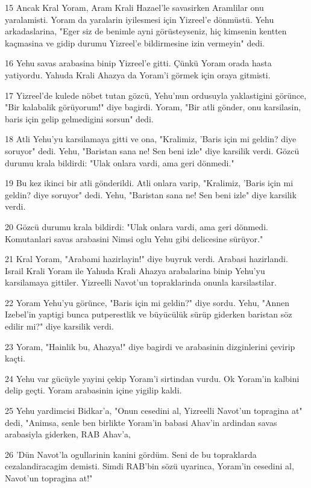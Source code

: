 \par 15 Ancak Kral Yoram, Aram Krali Hazael'le savasirken Aramlilar onu yaralamisti. Yoram da yaralarin iyilesmesi için Yizreel'e dönmüstü. Yehu arkadaslarina, "Eger siz de benimle ayni görüsteyseniz, hiç kimsenin kentten kaçmasina ve gidip durumu Yizreel'e bildirmesine izin vermeyin" dedi.
\par 16 Yehu savas arabasina binip Yizreel'e gitti. Çünkü Yoram orada hasta yatiyordu. Yahuda Krali Ahazya da Yoram'i görmek için oraya gitmisti.
\par 17 Yizreel'de kulede nöbet tutan gözcü, Yehu'nun ordusuyla yaklastigini görünce, "Bir kalabalik görüyorum!" diye bagirdi. Yoram, "Bir atli gönder, onu karsilasin, baris için gelip gelmedigini sorsun" dedi.
\par 18 Atli Yehu'yu karsilamaya gitti ve ona, "Kralimiz, 'Baris için mi geldin? diye soruyor" dedi. Yehu, "Baristan sana ne! Sen beni izle" diye karsilik verdi. Gözcü durumu krala bildirdi: "Ulak onlara vardi, ama geri dönmedi."
\par 19 Bu kez ikinci bir atli gönderildi. Atli onlara varip, "Kralimiz, 'Baris için mi geldin? diye soruyor" dedi. Yehu, "Baristan sana ne! Sen beni izle" diye karsilik verdi.
\par 20 Gözcü durumu krala bildirdi: "Ulak onlara vardi, ama geri dönmedi. Komutanlari savas arabasini Nimsi oglu Yehu gibi delicesine sürüyor."
\par 21 Kral Yoram, "Arabami hazirlayin!" diye buyruk verdi. Arabasi hazirlandi. Israil Krali Yoram ile Yahuda Krali Ahazya arabalarina binip Yehu'yu karsilamaya gittiler. Yizreelli Navot'un topraklarinda onunla karsilastilar.
\par 22 Yoram Yehu'yu görünce, "Baris için mi geldin?" diye sordu. Yehu, "Annen Izebel'in yaptigi bunca putperestlik ve büyücülük sürüp giderken baristan söz edilir mi?" diye karsilik verdi.
\par 23 Yoram, "Hainlik bu, Ahazya!" diye bagirdi ve arabasinin dizginlerini çevirip kaçti.
\par 24 Yehu var gücüyle yayini çekip Yoram'i sirtindan vurdu. Ok Yoram'in kalbini delip geçti. Yoram arabasinin içine yigilip kaldi.
\par 25 Yehu yardimcisi Bidkar'a, "Onun cesedini al, Yizreelli Navot'un topragina at" dedi, "Animsa, senle ben birlikte Yoram'in babasi Ahav'in ardindan savas arabasiyla giderken, RAB Ahav'a,
\par 26 'Dün Navot'la ogullarinin kanini gördüm. Seni de bu topraklarda cezalandiracagim demisti. Simdi RAB'bin sözü uyarinca, Yoram'in cesedini al, Navot'un topragina at!"
